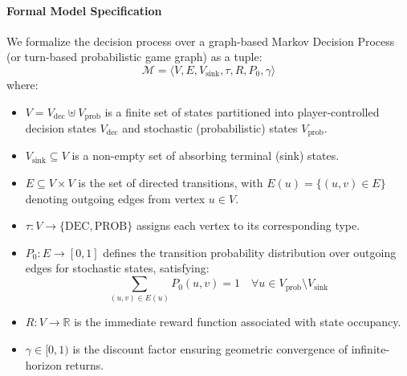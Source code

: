 \documentclass{article}
\begin{document}
\paragraph{Formal Model Specification}
We formalize the decision process over a graph-based Markov Decision Process (or turn-based probabilistic game graph) as a tuple:
\begin{equation}
\mathcal{M} = \langle V, E, V_{\text{sink}}, \tau, R, P_0, \gamma \rangle
\end{equation}
where:
\begin{itemize}
    \item $V = V_{\text{dec}} \uplus V_{\text{prob}}$ is a finite set of states partitioned into player-controlled decision states $V_{\text{dec}}$ and stochastic (probabilistic) states $V_{\text{prob}}$.
    \item $V_{\text{sink}} \subseteq V$ is a non-empty set of absorbing terminal (sink) states.
    \item $E \subseteq V \times V$ is the set of directed transitions, with $E(u) = \{ (u, v) \in E \}$ denoting outgoing edges from vertex $u \in V$.
    \item $\tau : V \to \{\text{DEC}, \text{PROB}\}$ assigns each vertex to its corresponding type.
    \item $P_0 : E \to [0, 1]$ defines the transition probability distribution over outgoing edges for stochastic states, satisfying:
    \begin{equation}
    \sum_{(u, v) \in E(u)} P_0(u, v) = 1 \quad \forall u \in V_{\text{prob}} \setminus V_{\text{sink}}
    \end{equation}
    \item $R : V \to \mathbb{R}$ is the immediate reward function associated with state occupancy.
    \item $\gamma \in [0, 1)$ is the discount factor ensuring geometric convergence of infinite-horizon returns.
\end{itemize}
\end{document}
